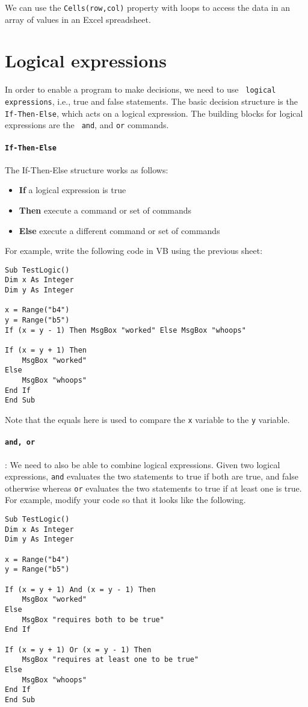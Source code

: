 \documentclass[10pt]{article}
\begin{document}
\noindent
We can use the {\tt Cells(row,col)} property with loops to access the 
data in an array of values in an Excel spreadsheet. 

\section{Logical expressions}
\label{sec:logic}

In order to enable a program to make decisions, we need to use {\tt
  logical expressions}, i.e., true and false statements.  The basic
decision structure is the {\tt If-Then-Else}, which acts on a logical
expression. The building blocks for logical expressions are the {\tt
  and}, and {\tt or} commands.

\paragraph{{\tt If-Then-Else}} The If-Then-Else structure works as
follows:

\begin{itemize}
\item[] {\bf If} a logical expression is true
\item[] {\bf Then} execute a command or set of commands
\item[] {\bf Else} execute a different command or set of commands
\end{itemize}

For example, write the following code in VB using the previous sheet:
\begin{verbatim}
Sub TestLogic()
Dim x As Integer
Dim y As Integer

x = Range("b4")
y = Range("b5")
If (x = y - 1) Then MsgBox "worked" Else MsgBox "whoops"

If (x = y + 1) Then
    MsgBox "worked"
Else
    MsgBox "whoops"
End If
End Sub
\end{verbatim}
Note that the equals here is used to compare the {\tt x} variable to
the {\tt y} variable.

\paragraph{{\tt and, or}}: We need to also be able to combine
logical expressions.  Given two logical expressions, {\tt and}
evaluates the two statements to true if both are true, and false
otherwise whereas {\tt or} evaluates the two statements to true if at
least one is true.  For example, modify your code so that it looks
like the following.
\begin{verbatim}
Sub TestLogic()
Dim x As Integer
Dim y As Integer

x = Range("b4")
y = Range("b5")

If (x = y + 1) And (x = y - 1) Then
    MsgBox "worked"
Else
    MsgBox "requires both to be true"
End If

If (x = y + 1) Or (x = y - 1) Then
    MsgBox "requires at least one to be true"
Else
    MsgBox "whoops"
End If
End Sub
\end{verbatim}
\end{document}
